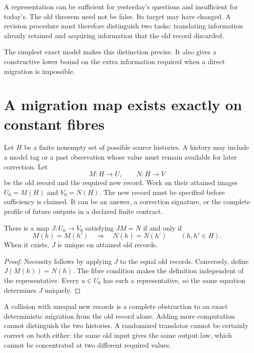 A representation can be sufficient for yesterday's questions and insufficient for today's. The old theorem need not be false. Its target may have changed. A revision procedure must therefore distinguish two tasks: translating information already retained and acquiring information that the old record discarded.

The simplest exact model makes this distinction precise. It also gives a constructive lower bound on the extra information required when a direct migration is impossible.

\section{A migration map exists exactly on constant fibres}
Let $H$ be a finite nonempty set of possible source histories. A history may include a model tag or a past observation whose value must remain available for later correction. Let
\[
 M:H\to U,\qquad N:H\to V
\]
be the old record and the required new record. Work on their attained images $U_0=M(H)$ and $V_0=N(H)$. The new record must be specified before sufficiency is claimed. It can be an answer, a correction signature, or the complete profile of future outputs in a declared finite contract.

\begin{Coretheorem}\label{Core:r:migration}
There is a map $J:U_0\to V_0$ satisfying $JM=N$ if and only if
\[
 M(h)=M(h')\quad\Longrightarrow\quad N(h)=N(h')
 \qquad(h,h'\in H).
\]
When it exists, $J$ is unique on attained old records.
\end{Coretheorem}
\begin{proof}
Necessity follows by applying $J$ to the equal old records. Conversely, define $J(M(h))=N(h)$. The fibre condition makes the definition independent of the representative. Every $u\in U_0$ has such a representative, so the same equation determines $J$ uniquely.
\end{proof}


A collision with unequal new records is a complete obstruction to an exact deterministic migration from the old record alone. Adding more computation cannot distinguish the two histories. A randomized translator cannot be certainly correct on both either: the same old input gives the same output law, which cannot be concentrated at two different required values.

